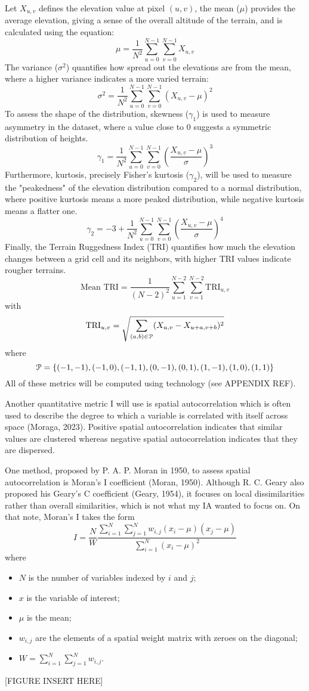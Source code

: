 Let $X_{u,v}$ defines the elevation value at pixel $(u,v)$, the mean ($\mu$) provides the average elevation, giving a sense of the overall altitude of the 
terrain, and is calculated using the equation:
\[\mu=\frac{1}{N^2}\sum_{u=0}^{N-1}\sum_{v=0}^{N-1}X_{u,v}\]
The variance ($\sigma^2$) quantifies how spread out the elevations are from the mean, where a higher variance indicates a more varied terrain:
\[\sigma^2=\frac{1}{N^2}\sum_{u=0}^{N-1}\sum_{v=0}^{N-1}{(X_{u,v}-\mu)}^2\]
To assess the shape of the distribution, skewness ($\gamma_1$) is used to measure asymmetry in the dataset, where a value close to 0 suggests a symmetric 
distribution of heights. 
\[\gamma_1=\frac{1}{N^2}\sum_{u=0}^{N-1}\sum_{v=0}^{N-1}{\left(\frac{X_{u,v}-\mu}{\sigma}\right)}^3\]
Furthermore, kurtosis, precisely Fisher's kurtosis ($\gamma_2$), will be used to measure the "peakedness" of the elevation distribution compared to a normal distribution, where positive kurtosis 
means a more peaked distribution, while negative kurtosis means a flatter one.
\[\gamma_2=-3+\frac{1}{N^2}\sum_{u=0}^{N-1}\sum_{v=0}^{N-1}{\left(\frac{X_{u,v}-\mu}{\sigma}\right)}^4\]
Finally, the Terrain Ruggedness Index (TRI) quantifies how much the elevation changes between a grid cell and its neighbors, with higher TRI values indicate 
rougher terrains.
\[\text{Mean TRI}=\frac{1}{(N-2)^2}\sum_{u=1}^{N-2}\sum_{v=1}^{N-2}\text{TRI}_{u,v}\]
with 
\[\text{TRI}_{u,v}=\sqrt{\sum_{(a,b)\in \EuScript{P}}(X_{u,v}-{X_{u+a,v+b}})^2}\]
where
\[\EuScript{P}=\{(-1,-1),(-1,0),(-1,1),(0,-1),(0,1),(1,-1),(1,0),(1,1)\}\]
All of these metrics will be computed using technology (see APPENDIX REF).

Another quantitative metric I will use is spatial autocorrelation which is often used to describe the degree to which a variable is correlated with itself 
across space (Moraga, 2023). Positive spatial autocorrelation indicates that similar values are clustered whereas negative spatial autocorrelation indicates 
that they are dispersed. 

One method, proposed by P. A. P. Moran in 1950, to assess spatial autocorrelation is Moran's I coefficient (Moran, 1950). Although R. C. Geary also proposed 
his Geary's C coefficient (Geary, 1954), it focuses on local dissimilarities rather than overall similarities, which is not what my IA wanted to focus on. 
On that note, Moran's I takes the form
\[I=\frac{N}{W}\frac{\sum_{i=1}^{N}\sum_{j=1}^{N}w_{i,j}(x_i-\mu)(x_j-\mu)}{\sum_{i=1}^{N}{(x_i-\mu)}^2}\]
where
\begin{itemize}
    \item $N$ is the number of variables indexed by $i$ and $j$;
    \item $x$ is the variable of interest;
    \item $\mu$ is the mean;
    \item $w_{i,j}$ are the elements of a spatial weight matrix with zeroes on the diagonal;
    \item $W=\sum_{i=1}^{N}\sum_{j=1}^{N}w_{i,j}$.
\end{itemize}
[FIGURE INSERT HERE]


